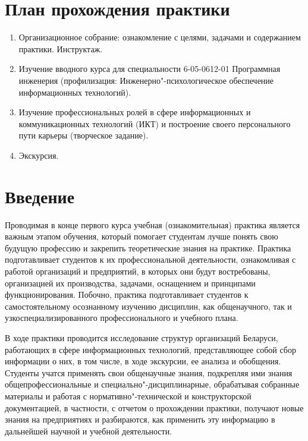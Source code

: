 \documentclass[variant=practice]{bsuir}
\begin{document}
\maketitle

\chapter*{План прохождения практики}

\begin{enumerate}
      \item Организационное собрание: ознакомление с целями, задачами и
            содержанием практики. Инструктаж.
      \item Изучение вводного курса  для
            специальности 6-05-0612-01 Программная инженерия (профилизация:
            Инженерно"-психологическое обеспечение информационных технологий).
      \item Изучение профессиональных ролей в сфере информационных и
            коммуникационных технологий (ИКТ) и построение своего персонального
            пути карьеры (творческое задание).
      \item Экскурсия.
\end{enumerate}

\maketoc*

\chapter*{Введение}

Проводимая в конце первого курса учебная (ознакомительная) практика является
важным этапом обучения, который помогает студентам лучше понять свою будущую
профессию и закрепить теоретические знания на практике. Практика подготавливает
студентов к их профессиональной деятельности, ознакомливая с работой организаций
и предприятий, в которых они будут востребованы, организацией их производства,
задачами, оснащением и принципами функционирования. Побочно, практика
подготавливает студентов к самостоятельному осознанному изучению дисциплин, как
общенаучного, так и узкоспециализированного профессионального и учебного плана.

В ходе практики проводится исследование структур организаций Беларуси,
работающих в сфере информационных технологий, представляющее собой сбор
информации о них, в том числе, в ходе экскурсии, ее анализа и обобщения.
Студенты учатся применять свои общенаучные знания, подкрепляя ими знания
общепрофессиональные и специально"-дисциплинарные, обрабатывая собранные
материалы и работая с нормативно"-технической и конструкторской документацией, в
частности, с отчетом о прохождении практики, получают новые знания на
предприятиях и разбираются, как применить эту информацию в дальнейшей научной и
учебной деятельности.
\end{document}

